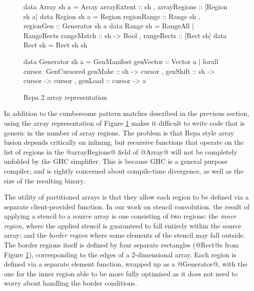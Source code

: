 \begin{figure}
\begin{small}
\begin{code}
data Array sh a
   = Array       { arrayExtent  :: sh
                 , arrayRegions :: [Region sh a] }
data Region sh a
   = Region      { regionRange  :: Range sh
                 , regionGen    :: Generator sh a }
data Range sh 
   = RangeAll
   | RangeRects  { rangeMatch   :: sh -> Bool
                 , rangeRects   :: [Rect sh] }
data Rect sh
   = Rect sh sh

data Generator sh a
   = GenManifest { genVector   :: Vector a }    
   | forall cursor. 
     GenCursored { genMake     :: sh -> cursor
                 , genShift    :: sh -> cursor -> cursor
                 , genLoad     :: cursor -> a }
\end{code}
\end{small}
\caption{Repa 2 array representation}
\label{figure:Repa2}
\end{figure}


In addition to the cumbersome pattern matches described in the previous section, using the array representation of Figure \ref{figure:Repa2} makes it difficult to write code that is generic in the number of array regions. The problem is that Repa style array fusion depends critically on inlining, but recursive functions that operate on the list of regions in the @arrayRegions@ field of @Array@ will not be completely unfolded by the GHC simplifier. This is because GHC is a general purpose compiler, and is rightly concerned about compile-time divergence, as well as the size of the resulting binary.

The utility of partitioned arrays is that they allow each region to be defined via a separate client-provided function. In our work on stencil convolution, \cite{Lippmeier:Stencil} the result of applying a stencil to a source array is one consisting of two regions: the \emph{inner region}, where the applied stencil is guaranteed to fall entirely within the source array; and the \emph{border region} where some elements of the stencil may fall outside. The border regions itself is defined by four separate rectangles (@Rect@s from Figure \ref{figure:Repa2}), corresponding to the edges of a 2-dimensional array. Each region is defined via a separate element function, wrapped up as a @Generator@, with the one for the inner region able to be more fully optimised as it does not need to worry about handling the border conditions.


